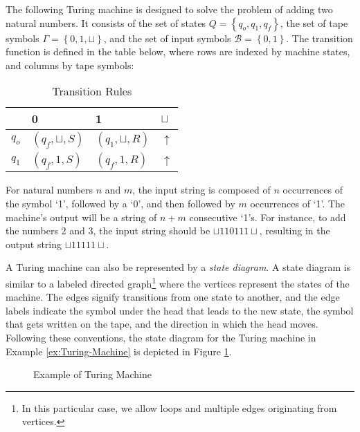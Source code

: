\begin{example}
\label{ex:Turing-Machine}
The following Turing machine is designed to solve the problem of adding two natural numbers. It consists of the set of states $Q = \left\{q_{o}, q_{1}, q_{f}\right\}$, the set of tape symbols $\Gamma = \left\{0, 1, \sqcup \right\}$, and the set of input symbols $\mathcal{B} = \left\{0, 1 \right\}$. The transition function is defined in the table below, where rows are indexed by machine states, and columns by tape symbols:

\begin{table}[h]
\centering
\begin{tabular}{l l l l}
\toprule
 & 0 & 1 & $\sqcup$ \\
\midrule
$q_{o}$ & $\left(q_{f}, \sqcup, S\right)$ & $\left(q_{1}, \sqcup, R\right)$ & $\uparrow$ \\
$q_{1}$ & $\left(q_{f}, 1     , S\right)$ & $\left(q_{f}, 1     , R\right)$ & $\uparrow$ \\
\bottomrule
\end{tabular}
\caption{Transition Rules}
\end{table}

For natural numbers $n$ and $m$, the input string is composed of $n$ occurrences of the symbol ‘1’, followed by a ‘0’, and then followed by $m$ occurrences of ‘1’. The machine's output will be a string of $n+m$ consecutive ‘1’s. For instance, to add the numbers 2 and 3, the input string should be $\sqcup 1 1 0 1 1 1 \sqcup$, resulting in the output string $\sqcup 1 1 1 1 1 \sqcup$.
\end{example}

A Turing machine can also be represented by a \emph{state diagram}. A state diagram is similar to a labeled directed graph\footnote{In this particular case, we allow loops and multiple edges originating from vertices.} where the vertices represent the states of the machine. The edges signify transitions from one state to another, and the edge labels indicate the symbol under the head that leads to the new state, the symbol that gets written on the tape, and the direction in which the head moves. Following these conventions, the state diagram for the Turing machine in Example \ref{ex:Turing-Machine} is depicted in Figure \ref{fig:Example-Turing-Machine}.

\begin{figure}[t]
\centering
{}
\caption{\label{fig:Example-Turing-Machine}Example of Turing Machine}
\end{figure}

